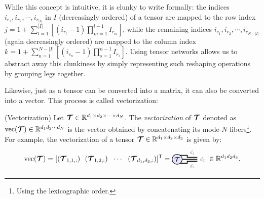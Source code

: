 While this concept is intuitive, it is clunky to write formally: the indices $i_{r_1},i_{r_2},\cdots, i_{r_{|I|}}$ in $I$ (decreasingly ordered) of a tensor are mapped to the row index $
j = 1+\sum_{l=1}^{|I|}
\left[(i_{r_l}-1)\prod_{m=1}^{l-1}I_{r_m}\right]
$, while the remaining indices $i_{c_1},i_{c_2},\cdots, i_{c_{N-|I|}}$ (again decreasingly ordered) are mapped to the column index $k  = 1+\sum_{n=1}^{N - |I|}
\left[(i_{c_n}-1)\prod_{s=1}^{n-1}I_{r_s}\right]$. Using tensor networks allows us to abstract away this clunkiness by simply representing such 
reshaping operations by grouping legs together. 






Likewise, just as a tensor can be converted into a matrix, it can also be converted into a vector. This process is called vectorization:
\begin{definition}(Vectorization)\label{def:vectorization}
Let $\Tt\in\RR^{d_1\times d_2\times\cdots\times d_N}$. The \emph{vectorization} of $\Tt$ denoted as $\vectorize(\Tt)\in\RR^{d_1d_2\cdots d_N}$ is the vector obtained by concatenating its mode-$N$ fibers\footnote{Using the lexicographic order.}. For example, the vectorization of a tensor $\Tt\in\RR^{d_1\times d_2\times d_3}$ is given by:
$$\vectorize(\Tt) =    
[(\Tt_{1,1,:})\ \  (\Tt_{1,2,:})\ \  \cdots \ \ (\Tt_{d_1,d_2,:})]^\ts
=
\begin{tikzpicture}[baseline=\baseline]
    \tikzset{tensor/.style = {minimum size = 0.5cm,shape = circle,thick,draw=black,inner sep = 0pt}, edge/.style = {thick,line width=.4mm},every loop/.style={}}
    \def\y{0}
    \def\x{0}
    \node[tensor,fill=blue!10!white] (A) at (\x,\y){\scalebox{0.85}{$\Tt$}};
    \draw[edge] (\x+0.15,\y+0.2) -- (\x+0.5,\y+0.2) -- (\x+0.5,\y+0.1) -- (\x+1,\y+0.1) node [midway,above]
    {\scalebox{0.7}{\dimcolor{$d_1$}}};
     \draw[edge] (A) -- (\x+1,\y)node [right]
    {\scalebox{0.7}{\dimcolor{$d_2$}}};

    \draw[edge] (\x+0.15,\y-0.2) -- (\x+0.5,\y-0.2)-- (\x+0.5,\y-0.1)-- (\x+1,\y-0.1) node [midway,below]
    {\scalebox{0.7}{\dimcolor{$d_3$}}};
    \end{tikzpicture}\in\RR^{d_1d_2d_3}.
$$
\end{definition}


